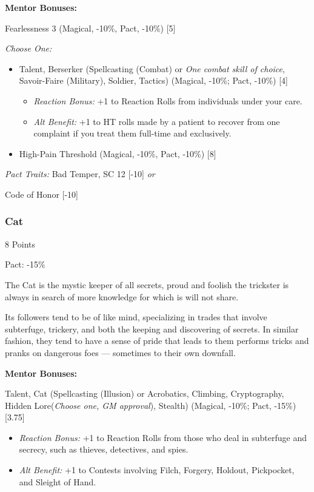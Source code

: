 \begin{multicols}{3}
	\textbf{Mentor Bonuses:} 
	
	Fearlessness 3 (Magical, -10\%, Pact, -10\%) [5]
	
	\textit{Choose One:}
	\begin{itemize}
		\itemsep 0pt
		\item Talent, Berserker (Spellcasting (Combat) or \textit{One combat skill of choice}, Savoir-Faire (Military), Soldier, Tactics) (Magical, -10\%; Pact, -10\%) [4]
		\begin{itemize}
			\itemsep 0pt
			\item \textit{Reaction Bonus:} +1 to Reaction Rolls from individuals under your care.
			\item \textit{Alt Benefit:} +1 to HT rolls made by a patient to recover from one complaint if you treat them full-time and exclusively.
		\end{itemize}
		\item High-Pain Threshold (Magical, -10\%, Pact, -10\%) [8]
	\end{itemize}
	
	\textit{Pact Traits:} Bad Temper, SC 12 [-10] \textit{or} 
	
	Code of Honor [-10]
		
	\subsubsection{Cat}
	\begin{flushright}
		8 Points
	\end{flushright}
	Pact: -15\%
	
	The Cat is the mystic keeper of all secrets, proud and foolish the trickster is always in search of more knowledge for which is will not share. 
	
	Its followers tend to be of like mind, specializing in trades that involve subterfuge, trickery, and both the keeping and discovering of secrets. In similar fashion, they tend to have a sense of pride that leads to them performs tricks and pranks on dangerous foes — sometimes to their own downfall.
	
	\textbf{Mentor Bonuses:} 
	
	Talent, Cat (Spellcasting (Illusion) or Acrobatics, Climbing, Cryptography, Hidden Lore(\textit{Choose one, GM approval}), Stealth) (Magical, -10\%; Pact, -15\%) [3.75]
	\begin{itemize}
		\itemsep 0pt
		\item \textit{Reaction Bonus:} +1 to Reaction Rolls from those who deal in subterfuge and secrecy, such as thieves, detectives, and spies.
		\item \textit{Alt Benefit:} +1 to Contests involving Filch, Forgery, Holdout, Pickpocket, and Sleight of Hand.
	\end{itemize}


\end{multicols}
